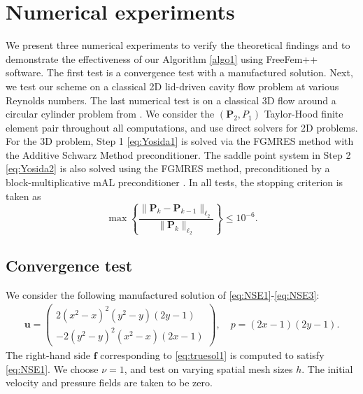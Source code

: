 \documentclass[3p]{elsarticle}
\def\V#1{\mathbf{#1}}
\begin{document}
\section{Numerical experiments}\label{Sec-Simulation}
We present three numerical experiments to verify the theoretical findings and to demonstrate the effectiveness of our Algorithm \ref{algo1} using FreeFem++ \cite{Hec2012} software. The first test is a convergence test with a manufactured solution. Next, we test our scheme on a classical 2D lid-driven cavity flow problem at various Reynolds numbers. The last numerical test is on a classical 3D flow around a circular cylinder problem from \cite{SchTurDurKraRan1996}. We consider the $(\V{P}_2,P_1)$ Taylor-Hood finite element pair throughout all computations, and use direct solvers for 2D problems. For the 3D problem, Step 1 \eqref{eq:Yosida1} is solved via the FGMRES method with the Additive Schwarz Method preconditioner. The saddle point system in Step 2 \eqref{eq:Yosida2} is 
also solved using the FGMRES method, preconditioned by a block-multiplicative mAL preconditioner \cite{MOULIN2019718}. In all tests, the stopping criterion is taken as 
%
$$\max\left \lbrace \dfrac{\|\V{P}_k-\V{P}_{k-1}\|_{\ell_2}}{\| \V{P}_k \|_{\ell_2}} \right \rbrace \leq 10^{-6}.$$ 
%
\subsection{Convergence test}
We consider the following manufactured solution of \eqref{eq:NSE1}-\eqref{eq:NSE3}:
\begin{align}\label{eq:truesol1}
	\V{u}=\left(%
	\begin{array}{c}
		2 (x^2 - x)^2 (y^2 - y)(2y - 1) \\
	   -2 (y^2 - y)^2 (x^2 - x)(2x - 1)%
	\end{array}%
	\right),\quad
	p = (2x-1)(2y-1).
\end{align}
The right-hand side $\V{f}$ corresponding to \eqref{eq:truesol1} is computed to satisfy \eqref{eq:NSE1}. We choose $\nu=1$, and test on varying spatial mesh sizes $h$. The initial velocity and pressure fields are taken to be zero. 
\end{document}
